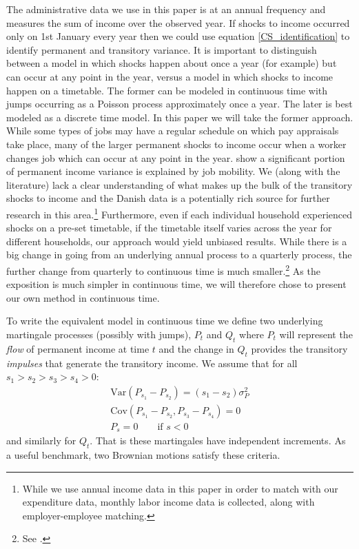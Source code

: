 \documentclass[titlepage]{\econtex}\newcommand{\texname}{ConsumptionHeterogeneity}
\begin{document}
The administrative data we use in this paper is at an annual frequency and measures the sum of income over the observed year. If shocks to income occurred only on 1st January every year then we could use equation \ref{CS_identification} to identify permanent and transitory variance. It is important to distinguish between a model in which shocks happen about once a year (for example) but can occur at any point in the year, versus a model in which shocks to income happen on a timetable. The former can be modeled in continuous time with jumps occurring as a Poisson process approximately once a year. The later is best modeled as a discrete time model. In this paper we will take the former approach. While some types of jobs may have a regular schedule on which pay appraisals take place, many of the larger permanent shocks to income occur when a worker changes job which can occur at any point in the year.{\cite{low_wage_2010} show a significant portion of permanent income variance is explained by job mobility.} We (along with the literature) lack a clear understanding of what makes up the bulk of the transitory shocks to income and the Danish data is a potentially rich source for further research in this area.\footnote{While we use annual income data in this paper in order to match with our expenditure data, monthly labor income data is collected, along with employer-employee matching.} Furthermore, even if each individual household experienced shocks on a pre-set timetable, if the timetable itself varies across the year for different households, our approach would yield unbiased results. While there is a big change in going from an underlying annual process to a quarterly process, the further change from quarterly to continuous time is much smaller.\footnote{See \cite{crawley_time_2018}.} As the exposition is much simpler in continuous time, we will therefore chose to present our own method in continuous time.

To write the equivalent model in continuous time we define two underlying martingale processes (possibly with jumps), $P_t$ and $Q_t$ where $P_t$ will represent the \textit{flow} of permanent income at time $t$ and the change in $Q_t$ provides the transitory \textit{impulses} that generate the transitory income. We assume that for all  $s_1>s_2>s_3>s_4>0$:
\begin{align*}
\mathrm{Var}(P_{s_1}-P_{s_2})=(s_1-s_2)\sigma_P^2 \\
\mathrm{Cov}(P_{s_1}-P_{s_2},P_{s_3}-P_{s_4}) = 0 \\
P_s = 0 \qquad \text{if } s<0
\end{align*}
and similarly for $Q_t$. That is these martingales have independent increments. As a useful benchmark, two Brownian motions satisfy these criteria.
\end{document}
